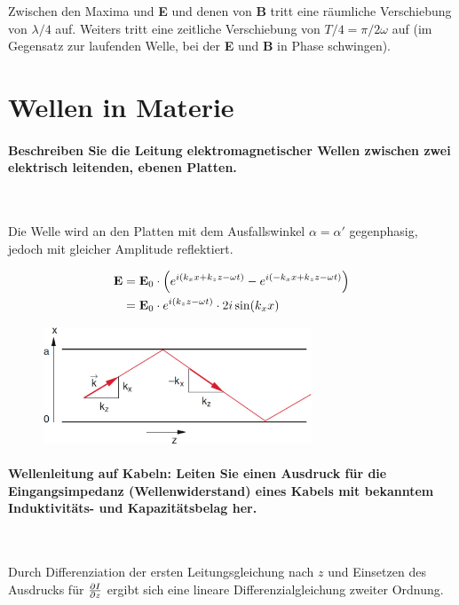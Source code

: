 \documentclass[a4paper, 11pt, ngerman, parskip=half-]{scrartcl}
\begin{document}
Zwischen den Maxima und \textbf{E} und denen von \textbf{B} tritt eine räumliche Verschiebung von
$\lambda/4$ auf. Weiters tritt eine zeitliche Verschiebung von $T/4 = \pi / 2 \omega$ auf (im
Gegensatz zur laufenden Welle, bei der \textbf{E} und \textbf{B} in Phase schwingen).

\newpage

\section{Wellen in Materie}

\paragraph{Beschreiben Sie die Leitung elektromagnetischer Wellen zwischen zwei elektrisch
    leitenden, ebenen Platten.} ~

Die Welle wird an den Platten mit dem Ausfallswinkel $\alpha = \alpha'$ gegenphasig, jedoch mit
gleicher Amplitude reflektiert.

\begin{equation}
    \begin{split}
        \vb{E} &= \vb{E}_0 \cdot \qty( e^{i(k_x x + k_z z - \omega t)} - e^{i(-k_x x + k_z z - \omega t)} ) \\
        &= \vb{E}_0 \cdot e^{i(k_z z - \omega t)} \cdot 2i \sin(k_x x)
    \end{split}
\end{equation}

\begin{figure}[H]
    \centering
    \includegraphics[width=8cm]{image/14/1}
\end{figure}

\paragraph{Wellenleitung auf Kabeln: Leiten Sie einen Ausdruck für die Eingangsimpedanz
    (Wellenwiderstand) eines Kabels mit bekanntem Induktivitäts- und Kapazitätsbelag her.} ~

Durch Differenziation der ersten Leitungsgleichung nach $z$ und Einsetzen des Ausdrucks für
$\pdv{I}{z}$ ergibt sich eine lineare Differenzialgleichung zweiter Ordnung.
\end{document}
